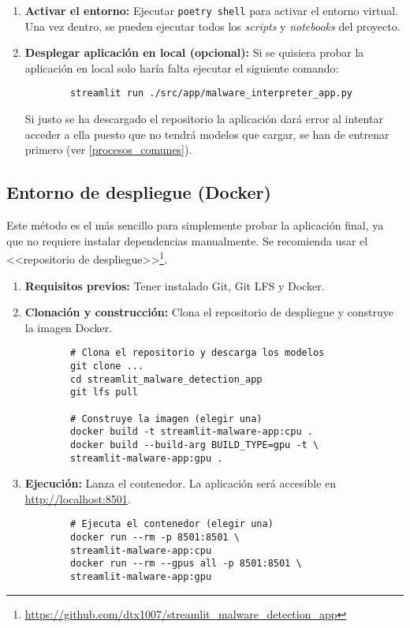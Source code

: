 \begin{enumerate}
	\item \textbf{Activar el entorno:} Ejecutar \texttt{poetry shell} para activar el entorno virtual. Una vez dentro, se pueden ejecutar todos los \textit{scripts} y \textit{notebooks} del proyecto.
	
	\item\textbf{ Desplegar aplicación en local (opcional):} Si se quisiera probar la aplicación en local solo haría falta ejecutar el siguiente comando:
	
	\begin{verbatim}
		streamlit run ./src/app/malware_interpreter_app.py
	\end{verbatim}
	
	\vspace{-1em}
	Si justo se ha descargado el repositorio la aplicación dará error al intentar acceder a ella puesto que no tendrá modelos que cargar, se han de entrenar primero (ver \ref{procesos_comunes}).
\end{enumerate}

\subsection{Entorno de despliegue (Docker)}
\label{despliegue_docker}
Este método es el más sencillo para simplemente probar la aplicación final, ya que no requiere instalar dependencias manualmente. Se recomienda usar el <<repositorio de despliegue>>\footnote{\url{https://github.com/dtx1007/streamlit_malware_detection_app}}.

\begin{enumerate}
	\item \textbf{Requisitos previos:} Tener instalado Git, Git LFS y Docker.
	
	\item \textbf{Clonación y construcción:} Clona el repositorio de despliegue y construye la imagen Docker.
	\begin{verbatim}
		# Clona el repositorio y descarga los modelos
		git clone ...
		cd streamlit_malware_detection_app
		git lfs pull
		
		# Construye la imagen (elegir una)
		docker build -t streamlit-malware-app:cpu .
		docker build --build-arg BUILD_TYPE=gpu -t \
		streamlit-malware-app:gpu .
	\end{verbatim}
	
	\item \textbf{Ejecución:} Lanza el contenedor. La aplicación será accesible en \url{http://localhost:8501}.
	\begin{verbatim}
		# Ejecuta el contenedor (elegir una)
		docker run --rm -p 8501:8501 \
		streamlit-malware-app:cpu
		docker run --rm --gpus all -p 8501:8501 \
		streamlit-malware-app:gpu
	\end{verbatim}
\end{enumerate}

